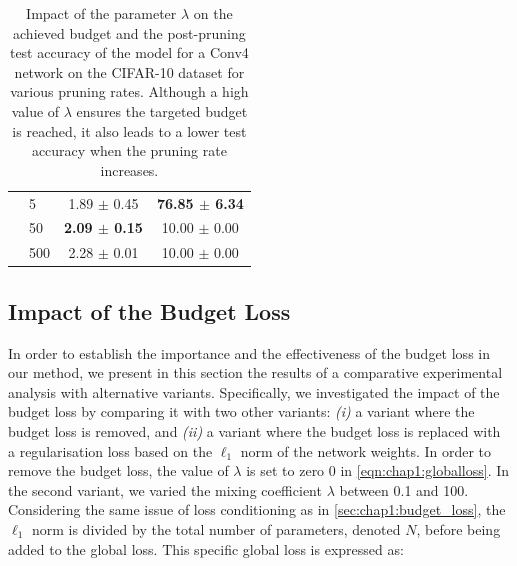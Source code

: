 \begin{table}[tbp]
\begin{center}
\begin{tabular}{llcc}
                                 & 5                                          & 1.89 $\pm$ 0.45               & \textbf{76.85 $\pm$ 6.34} \\
                                 & 50                                         & \textbf{2.09 $\pm$ 0.15}      & 10.00 $\pm$ 0.00          \\
                                 & 500                                        & 2.28 $\pm$ 0.01               & 10.00 $\pm$ 0.00          \\
      \bottomrule
    \end{tabular}
  \end{center}
  \caption{
    Impact of the parameter $\lambda$ on the achieved budget and the post-pruning test accuracy of the model for a Conv4 network on the CIFAR-10 dataset
    for various pruning rates. Although a high value of $\lambda$ ensures
    the targeted budget is reached, it also leads to a lower test accuracy when
    the pruning rate increases.}
  \label{tab:chap1:lambda_impact}
\end{table}



\subsection{Impact of the Budget Loss}
\label{sec:chap1:impact_of_budget_loss}


In order to establish the importance and the effectiveness of the budget loss in our
method, we present in this section the results of a comparative experimental
analysis with alternative variants.  Specifically, we investigated the impact of
the budget loss by comparing it with two other variants: \emph{(i)} a variant
where the budget loss is removed, and \emph{(ii)} a variant where the budget
loss is replaced with a regularisation loss based on the $\ell_1$ norm of the
network weights. In order to remove the budget loss, the value of $\lambda$ is set to
zero 0 in \cref{eqn:chap1:globalloss}. In the second variant, we varied the
mixing coefficient $\lambda$ between 0.1 and 100. Considering the same issue of
loss conditioning as in \cref{sec:chap1:budget_loss}, the $\ell_1$ norm is divided
by the total number of parameters, denoted $N$, before being added to the global loss. This
specific global loss is expressed as:

